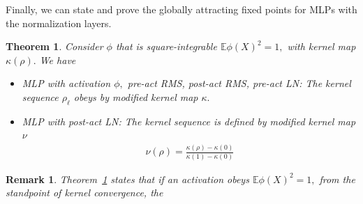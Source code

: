 \documentclass[twoside]{article}
\newcommand{\E}{\mathbb{E}}
\newtheorem{theorem}{Theorem}
\newtheorem{remark}{Remark}
\theoremstyle{definition}
\begin{document}
Finally, we can state and prove the globally attracting fixed points for MLPs with the normalization layers.

\begin{theorem}
\label{thm:global_attract_norm}
Consider $\phi$ that is square-integrable $\E \phi(X)^2 =1,$ with kernel map $\kappa(\rho).$ We have 
\begin{itemize}
\item MLP with activation $\phi,$ pre-act RMS, post-act RMS, pre-act LN: The kernel sequence $\rho_\ell$ obeys by modified  kernel map $\kappa.$ 
\item MLP with post-act LN: The kernel sequence is defined by modified  kernel map $\nu$ 
\begin{align*}
    \nu(\rho) = \frac{\kappa(\rho)-\kappa(0)}{\kappa(1)-\kappa(0)}
\end{align*}
\end{itemize}
\end{theorem}

\begin{remark}
    Theorem~\ref{thm:global_attract_norm} states that if an activation obeys $\E \phi(X)^2 =1,$ from the standpoint of kernel convergence, the 
\end{remark}
\end{document}
